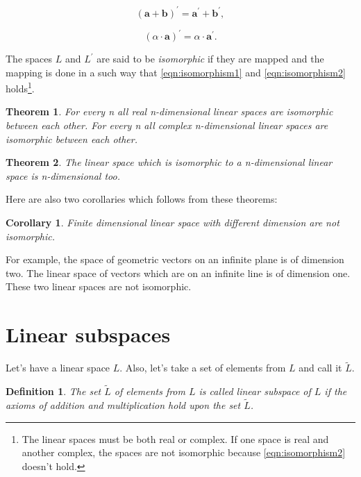 \documentclass{book}
\newtheorem{theorem}{Theorem}
\newtheorem{definition}{Definition}
\newtheorem{corollary}{Corollary}
\begin{document}
\begin{equation}
\label{eqn:isomorphism1}
(\boldsymbol{a} + \boldsymbol{b})^{'} = \boldsymbol{a^{'}} + \boldsymbol{b^{'}},
\end{equation}

\begin{equation}
\label{eqn:isomorphism2}
(\alpha \cdot \boldsymbol{a})^{'} = \alpha \cdot \boldsymbol{a^{'}}.
\end{equation}

The spaces $L$ and $L^{'}$ are said to be \emph{isomorphic} if they are mapped and the mapping is done in a such way that \eqref{eqn:isomorphism1} and \eqref{eqn:isomorphism2} holds\footnote{The linear spaces must be both real or complex. If one space is real and another complex, the spaces are not isomorphic because \eqref{eqn:isomorphism2} doesn't hold.}.

\begin{theorem}
For every n all real n-dimensional linear spaces are isomorphic between each other. For every n all complex n-dimensional linear spaces are isomorphic between each other.
\end{theorem}

\begin{theorem}
The linear space which is isomorphic to a n-dimensional linear space is n-dimensional too.
\end{theorem}

Here are also two corollaries which follows from these theorems:

\begin{corollary}
Finite dimensional linear space with different dimension are not isomorphic.
\end{corollary}

For example, the space of geometric vectors on an infinite plane is of dimension two. The linear space of vectors which are on an infinite line is of dimension one. These two linear spaces are not isomorphic.

\section{Linear subspaces}

Let's have a linear space $L$. Also, let's take a set of elements from $L$ and call it $\widetilde{L}$.

\begin{definition}
The set $\widetilde{L}$ of elements from $L$ is called linear subspace of $L$ if the axioms of addition and multiplication hold upon the set $\widetilde{L}$.
\end{definition}
\end{document}
